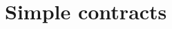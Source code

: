 \documentclass[a4paper,11pt,twoside,openright]{report}
\begin{document}







\section{Simple contracts}
\end{document}
